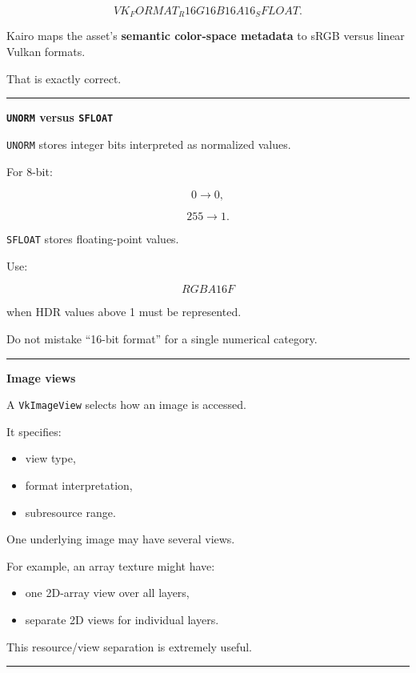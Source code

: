 \[
VK_FORMAT_R16G16B16A16_SFLOAT.
\]

Kairo maps the asset's \textbf{semantic color-space metadata} to sRGB versus linear Vulkan formats.

That is exactly correct.

\begin{center}\rule{0.5\linewidth}{0.5pt}\end{center}

\textbf{\texttt{UNORM} versus \texttt{SFLOAT}}

\texttt{UNORM} stores integer bits interpreted as normalized values.

For 8-bit:

\[
0\rightarrow0,
\]

\[
255\rightarrow1.
\]

\texttt{SFLOAT} stores floating-point values.

Use:

\[
RGBA16F
\]

when HDR values above 1 must be represented.

Do not mistake ``16-bit format'' for a single numerical category.

\begin{center}\rule{0.5\linewidth}{0.5pt}\end{center}

\textbf{Image views}

A \texttt{VkImageView} selects how an image is accessed.

It specifies:

\begin{itemize}
\tightlist
\item
  view type,
\item
  format interpretation,
\item
  subresource range.
\end{itemize}

One underlying image may have several views.

For example, an array texture might have:

\begin{itemize}
\tightlist
\item
  one 2D-array view over all layers,
\item
  separate 2D views for individual layers.
\end{itemize}

This resource/view separation is extremely useful.

\begin{center}\rule{0.5\linewidth}{0.5pt}\end{center}

